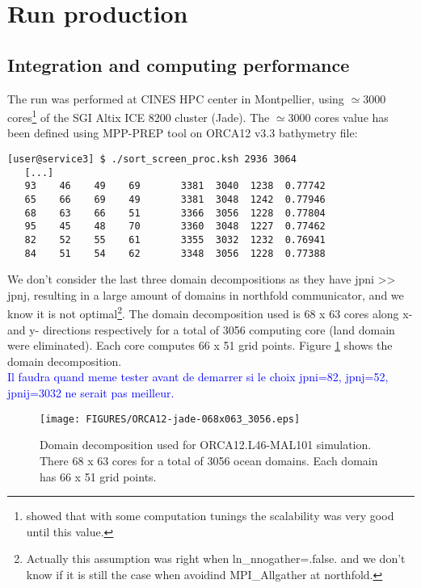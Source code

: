 \section{Run production}

\subsection{Integration and computing performance}

The run was performed at CINES HPC center in Montpellier, using $\simeq$3000 cores\footnote{\cite{Lecointre_perfNEMO3.4} 
showed that with some computation tunings the scalability was very good until this value.} of the SGI Altix ICE 8200 cluster (Jade). 
The $\simeq$3000 cores value has been defined using MPP-PREP tool on ORCA12 v3.3 bathymetry file:
\begin{verbatim}
[user@service3] $ ./sort_screen_proc.ksh 2936 3064
   [...]
   93    46    49    69       3381  3040  1238  0.77742
   65    66    69    49       3381  3048  1242  0.77946
   68    63    66    51       3366  3056  1228  0.77804
   95    45    48    70       3360  3048  1227  0.77462
   82    52    55    61       3355  3032  1232  0.76941
   84    51    54    62       3348  3056  1228  0.77388
\end{verbatim}
We don't consider the last three domain decompositions as they have jpni >> jpnj, resulting in a large amount of domains in northfold communicator, 
and we know it is not optimal\footnote{Actually this assumption was right when ln\_nnogather=.false. and we don't 
know if it is still the case when avoidind MPI\_Allgather at northfold.}. 
The domain decomposition used is 68 x 63 cores along x- and y- directions respectively for a total of 3056 computing core (land domain were eliminated). 
Each core computes 66 x 51 grid points. Figure \ref{decomp} shows the domain decomposition. \\

\textcolor{blue}{Il faudra quand meme tester avant de demarrer si le choix jpni=82, jpnj=52, jpnij=3032 ne serait pas meilleur.}


\begin{figure}[H]
\begin{center}
\texttt{[image: FIGURES/ORCA12-jade-068x063\_3056.eps]}
\caption{Domain decomposition used for ORCA12.L46-MAL101 simulation. There 68 x 63 cores for a total of 3056 ocean domains. Each domain has 66 x 51 grid points.}
\label{decomp}
\end{center}
\end{figure}

